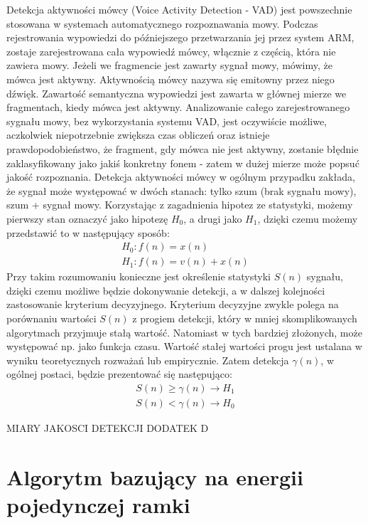 \documentclass[eng,printmode]{mgr}
\begin{document}
 Detekcja aktywności mówcy (Voice Activity Detection - VAD) jest powszechnie stosowana w systemach automatycznego rozpoznawania mowy. Podczas rejestrowania wypowiedzi do późniejszego przetwarzania jej przez system ARM, zostaje zarejestrowana cała wypowiedź mówcy, włącznie z częścią, która nie zawiera mowy. Jeżeli we fragmencie jest zawarty sygnał mowy, mówimy, że mówca jest aktywny. Aktywnością mówcy nazywa się emitowny przez niego dźwięk.  Zawartość semantyczna wypowiedzi jest zawarta w głównej mierze we fragmentach, kiedy mówca jest aktywny. Analizowanie całego  zarejestrowanego sygnału mowy, bez wykorzystania systemu VAD, jest oczywiście możliwe, aczkolwiek niepotrzebnie zwiększa czas obliczeń oraz istnieje prawdopodobieństwo, że fragment, gdy mówca nie jest aktywny, zostanie błędnie zaklasyfikowany jako jakiś konkretny fonem - zatem w dużej mierze może popsuć jakość rozpoznania. Detekcja aktywności mówcy w ogólnym przypadku zakłada, że sygnał może występować w dwóch stanach: tylko szum (brak sygnału mowy), szum + sygnał mowy. Korzystając z zagadnienia hipotez ze statystyki, możemy pierwszy stan oznaczyć jako hipotezę $H_{0}$, a drugi jako $H_{1}$, dzięki czemu możemy przedstawić to w następujący sposób:
 \begin{equation}
  \begin{array}{c}
	  H_{0}: f(n)=x(n)\\
	  H_{1}: f(n)=v(n)+x(n)
  \end{array} 	 
 \end{equation}
  Przy takim rozumowaniu konieczne jest określenie statystyki $S(n)$ sygnału, dzięki czemu możliwe będzie dokonywanie detekcji, a w dalszej kolejności zastosowanie kryterium decyzyjnego. Kryterium decyzyjne zwykle polega na porównaniu wartości $S(n)$ z progiem detekcji, który w mniej skomplikowanych algorytmach przyjmuje stałą wartość. Natomiast w tych bardziej złożonych, może występować np. jako funkcja czasu. Wartość stałej wartości progu jest ustalana w wyniku teoretycznych rozważań lub empirycznie. Zatem detekcja $\gamma(n)$, w ogólnej postaci, będzie prezentować się następująco:
   \begin{equation}
   \begin{array}{c}
	   S(n)\geq\gamma(n)\to H_{1}\\
	   S(n)<\gamma(n)\to H_{0}
   \end{array} 	 
   \end{equation}
 
	MIARY JAKOSCI DETEKCJI DODATEK D 
 

 \section{Algorytm bazujący na energii pojedynczej ramki}
\end{document}
